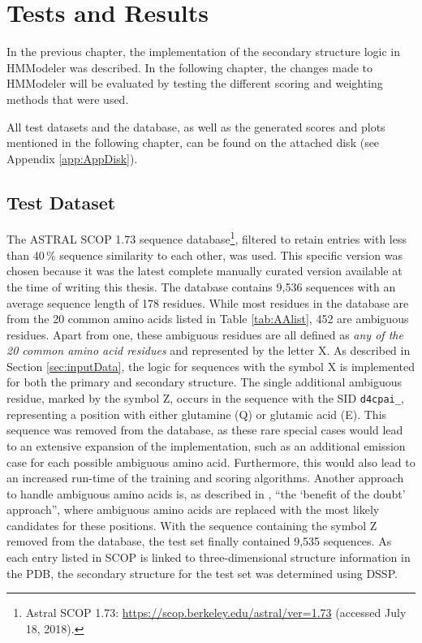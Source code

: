 

\chapter{Tests and Results}
\label{ch:evaluate}

In the previous chapter, the implementation of the secondary structure logic in HMModeler was described. In the following chapter, the changes made to HMModeler will be evaluated by testing the different scoring and weighting methods that were used.

All test datasets and the database, as well as the generated scores and plots mentioned in the following chapter, can be found on the attached disk (see Appendix \ref{app:AppDisk}).

\section{Test Dataset}
\label{sec:TestData}


 The ASTRAL SCOP 1.73 sequence database\footnote{Astral SCOP 1.73: \url{https://scop.berkeley.edu/astral/ver=1.73} (accessed July 18, 2018).}, filtered to retain entries  with less than 40\,\% sequence similarity to each other, was used. This specific version was chosen because it was the latest complete manually curated version available at the time of writing this thesis.  
 The database contains 9,536 sequences with an average sequence length of 178 residues. While most residues in the database are from the 20 common amino acids listed in Table \ref{tab:AAlist}, 452 are ambiguous residues. Apart from one, these ambiguous residues are all defined as \textit{any of the 20 common amino acid residues} and represented by the letter X. 
 As described in Section \ref{sec:inputData}, the logic for sequences with the symbol X is implemented for both the primary and secondary structure. The single additional ambiguous residue, marked by the symbol Z, occurs in the sequence with the \ac{SID} \texttt{d4cpai\_}, representing a position with either glutamine (Q) or glutamic acid (E).  This sequence was removed from the database, as these rare special cases would lead to an extensive expansion of the implementation, such as an additional emission case for each possible ambiguous amino acid. Furthermore, this would also lead to an increased \mbox{run-time} of the training and scoring algorithms.  
 Another approach to handle ambiguous amino acids is, as described in \mbox{\cite[p.~183]{Baldi.2001}}, ``the  `benefit of the doubt'    approach'', where ambiguous amino acids are replaced with the most likely candidates for these positions.  
 With the sequence containing the symbol Z removed from the database, the test set finally contained 9,535 sequences. As each entry listed in \ac{SCOP} is linked to \mbox{three-dimensional} structure information in the \ac{PDB}, the secondary structure for the test set was determined using DSSP.  
 
